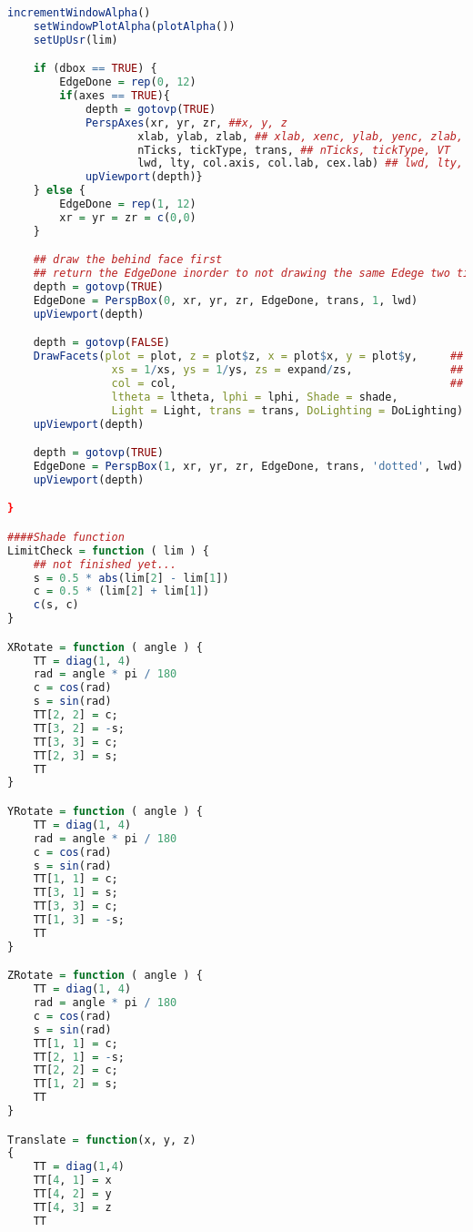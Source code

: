 \begin{lstlisting}[language = R]
    incrementWindowAlpha()
    setWindowPlotAlpha(plotAlpha())
    setUpUsr(lim)

    if (dbox == TRUE) {
        EdgeDone = rep(0, 12)
        if(axes == TRUE){
            depth = gotovp(TRUE)
            PerspAxes(xr, yr, zr, ##x, y, z
                    xlab, ylab, zlab, ## xlab, xenc, ylab, yenc, zlab, zenc
                    nTicks, tickType, trans, ## nTicks, tickType, VT
                    lwd, lty, col.axis, col.lab, cex.lab) ## lwd, lty, col.axis, col.lab, cex.lab
            upViewport(depth)}
    } else {
        EdgeDone = rep(1, 12)
        xr = yr = zr = c(0,0)
    }

    ## draw the behind face first
    ## return the EdgeDone inorder to not drawing the same Edege two times.
    depth = gotovp(TRUE)
    EdgeDone = PerspBox(0, xr, yr, zr, EdgeDone, trans, 1, lwd)
    upViewport(depth)

    depth = gotovp(FALSE)
    DrawFacets(plot = plot, z = plot$z, x = plot$x, y = plot$y,     ## basic
                xs = 1/xs, ys = 1/ys, zs = expand/zs,               ## Light
                col = col,                                          ## cols
                ltheta = ltheta, lphi = lphi, Shade = shade, 
                Light = Light, trans = trans, DoLighting = DoLighting)
    upViewport(depth)

    depth = gotovp(TRUE)
    EdgeDone = PerspBox(1, xr, yr, zr, EdgeDone, trans, 'dotted', lwd)
    upViewport(depth)

}

####Shade function
LimitCheck = function ( lim ) {
    ## not finished yet...
    s = 0.5 * abs(lim[2] - lim[1])
    c = 0.5 * (lim[2] + lim[1])
    c(s, c)
}

XRotate = function ( angle ) {
    TT = diag(1, 4)
    rad = angle * pi / 180
    c = cos(rad)
    s = sin(rad)
    TT[2, 2] = c;
    TT[3, 2] = -s;
    TT[3, 3] = c;
    TT[2, 3] = s;
    TT
}

YRotate = function ( angle ) {
    TT = diag(1, 4)
    rad = angle * pi / 180
    c = cos(rad)
    s = sin(rad)
    TT[1, 1] = c;
    TT[3, 1] = s;
    TT[3, 3] = c;
    TT[1, 3] = -s;
    TT
}

ZRotate = function ( angle ) {
    TT = diag(1, 4)
    rad = angle * pi / 180
    c = cos(rad)
    s = sin(rad)
    TT[1, 1] = c;
    TT[2, 1] = -s;
    TT[2, 2] = c;
    TT[1, 2] = s;
    TT
}

Translate = function(x, y, z)
{
    TT = diag(1,4)
    TT[4, 1] = x
    TT[4, 2] = y
    TT[4, 3] = z
    TT


\end{lstlisting}
